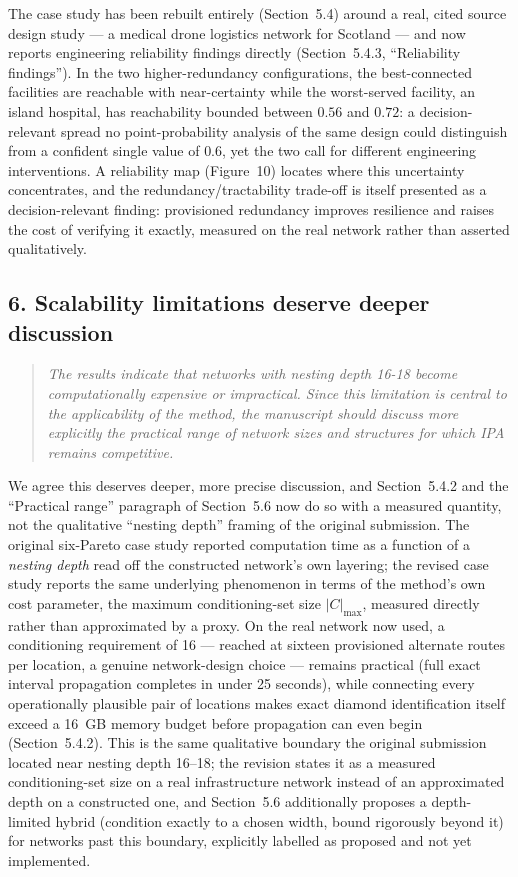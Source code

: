 \documentclass[11pt]{article}
\newenvironment{revcomment}
  {\begin{quote}\itshape\color{gray!60!black}}
  {\end{quote}}
\begin{document}
The case study has been rebuilt entirely (Section~5.4) around a real, cited source design study --- a medical drone logistics network for Scotland --- and now reports engineering reliability findings directly (Section~5.4.3, ``Reliability findings''). In the two higher-redundancy configurations, the best-connected facilities are reachable with near-certainty while the worst-served facility, an island hospital, has reachability bounded between $0.56$ and $0.72$: a decision-relevant spread no point-probability analysis of the same design could distinguish from a confident single value of $0.6$, yet the two call for different engineering interventions. A reliability map (Figure~10) locates where this uncertainty concentrates, and the redundancy/tractability trade-off is itself presented as a decision-relevant finding: provisioned redundancy improves resilience and raises the cost of verifying it exactly, measured on the real network rather than asserted qualitatively.

\subsection*{6. Scalability limitations deserve deeper discussion}
\begin{revcomment}
The results indicate that networks with nesting depth 16-18 become computationally expensive or impractical. Since this limitation is central to the applicability of the method, the manuscript should discuss more explicitly the practical range of network sizes and structures for which IPA remains competitive.
\end{revcomment}

We agree this deserves deeper, more precise discussion, and Section~5.4.2 and the ``Practical range'' paragraph of Section~5.6 now do so with a measured quantity, not the qualitative ``nesting depth'' framing of the original submission. The original six-Pareto case study reported computation time as a function of a \emph{nesting depth} read off the constructed network's own layering; the revised case study reports the same underlying phenomenon in terms of the method's own cost parameter, the maximum conditioning-set size $|C|_{\max}$, measured directly rather than approximated by a proxy. On the real network now used, a conditioning requirement of 16 --- reached at sixteen provisioned alternate routes per location, a genuine network-design choice --- remains practical (full exact interval propagation completes in under 25 seconds), while connecting every operationally plausible pair of locations makes exact diamond identification itself exceed a 16~GB memory budget before propagation can even begin (Section~5.4.2). This is the same qualitative boundary the original submission located near nesting depth 16--18; the revision states it as a measured conditioning-set size on a real infrastructure network instead of an approximated depth on a constructed one, and Section~5.6 additionally proposes a depth-limited hybrid (condition exactly to a chosen width, bound rigorously beyond it) for networks past this boundary, explicitly labelled as proposed and not yet implemented.
\end{document}
